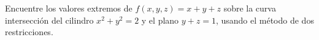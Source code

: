 Encuentre los valores extremos de $f(x, y, z) = x + y + z$ sobre la curva intersección del cilindro $x^2 + y^2 = 2$ y el plano $y + z = 1$, usando el método de dos restricciones.

